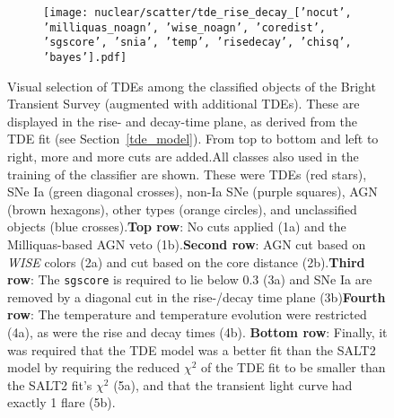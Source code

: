 \begin{figure}[htb]
\begin{subfigure}[b]{0.49\textwidth}
    \end{subfigure}
    \begin{subfigure}[b]{0.49\textwidth}
        \centering
        \texttt{[image: nuclear/scatter/tde\_rise\_decay\_['nocut', 'milliquas\_noagn', 'wise\_noagn', 'coredist', 'sgscore', 'snia', 'temp', 'risedecay', 'chisq', 'bayes'].pdf]}
    \end{subfigure}
    \caption[BTS selection]{Visual selection of TDEs among the classified objects of the Bright Transient Survey (augmented with additional TDEs). These are displayed in the rise- and decay-time plane, as derived from the TDE fit (see Section~\ref{tde_model}). From top to bottom and left to right, more and more cuts are added.\newline \newline All classes also used in the training of the classifier are shown. These were TDEs (red stars), SNe Ia (green diagonal crosses), non-Ia SNe (purple squares), AGN (brown hexagons), other types (orange circles), and unclassified objects (blue crosses).\newline \newline \textbf{Top row}: No cuts applied (1a) and the Milliquas-based AGN veto (1b).\newline \newline \textbf{Second row}: AGN cut based on \textit{WISE} colors (2a) and cut based on the core distance (2b).\newline \newline \textbf{Third row}: The \texttt{sgscore} is required to lie below 0.3 (3a) and SNe Ia are removed by a diagonal cut in the rise-/decay time plane (3b)\newline \newline \textbf{Fourth row}: The temperature and temperature evolution were restricted (4a), as were the rise and decay times (4b). \newline \newline \textbf{Bottom row}: Finally, it was required that the TDE model was a better fit than the SALT2 model by requiring the reduced $\chi^2$ of the TDE fit to be smaller than the SALT2 fit's $\chi^2$ (5a), and that the transient light curve had exactly 1 flare (5b).}
\end{figure}


